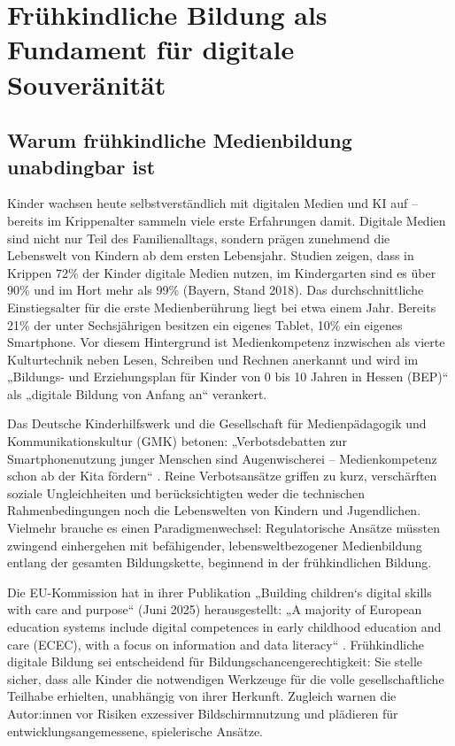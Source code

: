 \documentclass[11pt,a4paper]{article}
\begin{document}
	\section{Frühkindliche Bildung als Fundament für digitale Souveränität}
	
	\subsection{Warum frühkindliche Medienbildung unabdingbar ist}
	Kinder wachsen heute selbstverständlich mit digitalen Medien und KI auf – bereits im Krippenalter sammeln viele erste Erfahrungen damit. Digitale Medien sind nicht nur Teil des Familienalltags, sondern prägen zunehmend die Lebenswelt von Kindern ab dem ersten Lebensjahr. Studien zeigen, dass in Krippen 72\% der Kinder digitale Medien nutzen, im Kindergarten sind es über 90\% und im Hort mehr als 99\% (Bayern, Stand 2018). Das durchschnittliche Einstiegsalter für die erste Medienberührung liegt bei etwa einem Jahr. Bereits 21\% der unter Sechsjährigen besitzen ein eigenes Tablet, 10\% ein eigenes Smartphone. Vor diesem Hintergrund ist Medienkompetenz inzwischen als vierte Kulturtechnik neben Lesen, Schreiben und Rechnen anerkannt und wird im „Bildungs- und Erziehungsplan für Kinder von 0 bis 10 Jahren in Hessen (BEP)“ als „digitale Bildung von Anfang an“ verankert.
	
	Das Deutsche Kinderhilfswerk und die Gesellschaft für Medienpädagogik und Kommunikationskultur (GMK) betonen: „Verbotsdebatten zur Smartphonenutzung junger Menschen sind Augenwischerei – Medienkompetenz schon ab der Kita fördern“ \cite{dkhw2026}. Reine Verbotsansätze griffen zu kurz, verschärften soziale Ungleichheiten und berücksichtigten weder die technischen Rahmenbedingungen noch die Lebenswelten von Kindern und Jugendlichen. Vielmehr brauche es einen Paradigmenwechsel: Regulatorische Ansätze müssten zwingend einhergehen mit befähigender, lebensweltbezogener Medienbildung entlang der gesamten Bildungskette, beginnend in der frühkindlichen Bildung.
	
	Die EU-Kommission hat in ihrer Publikation „Building children‘s digital skills with care and purpose“ (Juni 2025) herausgestellt: „A majority of European education systems include digital competences in early childhood education and care (ECEC), with a focus on information and data literacy“ \cite{eucomm2025b}. Frühkindliche digitale Bildung sei entscheidend für Bildungschancengerechtigkeit: Sie stelle sicher, dass alle Kinder die notwendigen Werkzeuge für die volle gesellschaftliche Teilhabe erhielten, unabhängig von ihrer Herkunft. Zugleich warnen die Autor:innen vor Risiken exzessiver Bildschirmnutzung und plädieren für entwicklungsangemessene, spielerische Ansätze.
	
\end{document}
